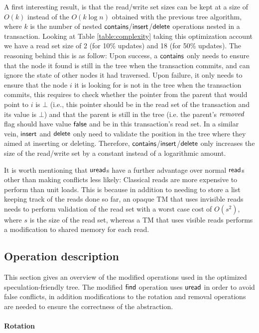 A first interesting result, is that 
the read/write set sizes can be kept at a size of $O(k)$ instead of the $O(k\log{n})$ obtained with the previous tree algorithm, 
where $k$ is the number of nested $\act{contains}$/$\act{insert}$/$\act{delete}$ operations nested in a transaction.
Looking at Table \ref{table:complexity} taking this optimization account we have a read set size of 2 (for 10\% updates) and 
18 (for 50\% updates).
The reasoning behind this is as follow:
Upon success, a $\act{contains}$ only needs to ensure that the node it found is still in the tree when the transaction commits,
and can ignore the state of other nodes it had traversed. Upon failure, it only needs to ensure that the node $i$ it is looking 
for is not in the tree when the transaction commits, this requires to check whether the pointer from the
parent that would point to $i$ is $\bot$ (i.e., this pointer should be in the read set of the transaction and its value is $\bot$)
and that the parent is still in the tree (i.e. the parent's $\ms{removed}$ flag should have value $\lit{false}$ and be in this transaction's read set.
In a similar vein, $\act{insert}$ and $\act{delete}$ only need to validate the position in the tree where they aimed at inserting or deleting.
Therefore, $\act{contains}$/$\act{insert}$/$\act{delete}$ only increases the size of the read/write set by a constant instead of a logarithmic 
amount.

It is worth mentioning that $\act{uread}$s have a further advantage over normal $\act{read}$s other than making conflicts less likely:
Classical reads are more expensive to perform than unit loads.
This is because in addition to needing to store a list keeping track of the reads done so far, 
an opaque TM that uses invisible reads needs to perform validation of the read set with a worst case cost of 
$O(s^2)$,
where $s$ is the size of the read set, whereas a TM that uses visible reads performs a modification to shared memory for each read.


\subsection{Operation description}
This section gives an overview of the modified operations used in the optimized speculation-friendly tree.
The modified $\act{find}$ operation uses $\act{uread}$ in order to avoid false conflicts, in addition
modifications to the rotation and removal operations are needed to ensure the correctness of the abstraction.

\paragraph{Rotation}


